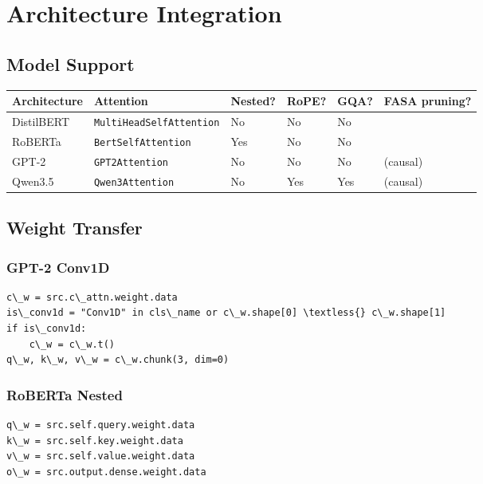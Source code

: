 
\section{Architecture Integration}

\subsection{Model Support}

\begin{table}[H]
\centering
\small
\begin{tabular}{llllll}
\toprule
\textbf{Architecture} & \textbf{Attention} & \textbf{Nested?} & \textbf{RoPE?} & \textbf{GQA?} & \textbf{FASA pruning?} \\
\midrule
DistilBERT & \texttt{MultiHeadSelfAttention} & No & No & No &  \\
RoBERTa & \texttt{BertSelfAttention} & Yes & No & No &  \\
GPT-2 & \texttt{GPT2Attention} & No & No & No & (causal) \\
Qwen3.5 & \texttt{Qwen3Attention} & No & Yes & Yes & (causal) \\
\bottomrule
\end{tabular}
\end{table}

\subsection{Weight Transfer}

\subsubsection{GPT-2 Conv1D}

\begin{lstlisting}
c\_w = src.c\_attn.weight.data
is\_conv1d = "Conv1D" in cls\_name or c\_w.shape[0] \textless{} c\_w.shape[1]
if is\_conv1d:
    c\_w = c\_w.t()
q\_w, k\_w, v\_w = c\_w.chunk(3, dim=0)
\end{lstlisting}

\subsubsection{RoBERTa Nested}

\begin{lstlisting}
q\_w = src.self.query.weight.data
k\_w = src.self.key.weight.data
v\_w = src.self.value.weight.data
o\_w = src.output.dense.weight.data
\end{lstlisting}

